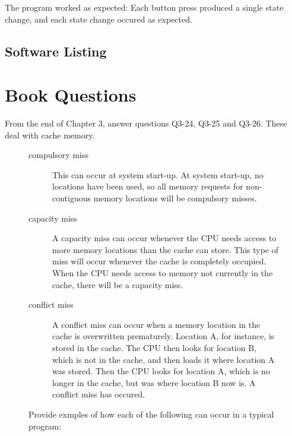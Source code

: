 \documentclass{article}
\begin{document}
The program worked as expected: Each button press produced a single state change, and each state change occured as expected. 

\subsection{Software Listing}


\newpage

\newpage



\newpage
\section{Book Questions}
From the end of Chapter 3, answer questions Q3-24, Q3-25 and Q3-26. These deal with
   cache memory.

\setcounter{figure}{23}
\begin{figure}[h]
	\caption{Provide exmples of how each of the following can occur in a typical program:
		}
\begin{description}
	\item[compulsory miss] This can occur at system start-up. At system start-up, no locations have been used, so all memory requests for non-contiguous memory locations will be compulsory misses.
	\item[capacity miss] A capacity miss can occur whenever the CPU needs access to more memory locations than the cache can store. This type of miss will occur whenever the cache is completely occupied. When the CPU needs access to memory not currently in the cache, there will be a capacity miss.  
	\item[conflict miss] A conflict miss can occur when a memory location in the cache is overwritten prematurely. Location A, for instance, is stored in the cache. The CPU then looks for location B, which is not in the cache, and then loads it where location A was stored. Then the CPU looks for location A, which is no longer in the cache, but was where location B now is. A conflict miss has occured. 
\end{description}
\end{figure}
\end{document}
